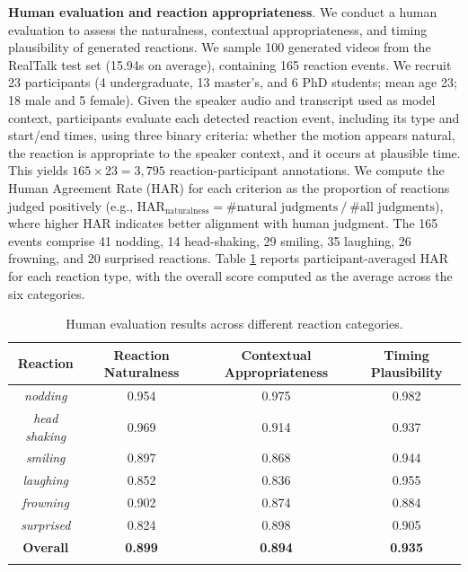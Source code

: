 


\textbf{Human evaluation and reaction appropriateness}. We conduct a human evaluation to assess the naturalness, contextual appropriateness, and timing plausibility of generated reactions. We sample 100 generated videos from the RealTalk test set (15.94s on average), containing 165 reaction events. We recruit 23 participants (4 undergraduate, 13 master's, and 6 PhD students; mean age 23; 18 male and 5 female). Given the speaker audio and transcript used as model context, participants evaluate each detected reaction event, including its type and start/end times, using three binary criteria: whether the motion appears natural, the reaction is appropriate to the speaker context, and it occurs at plausible time. This yields $165\times23=3{,}795$ reaction-participant annotations. We compute the Human Agreement Rate (HAR) for each criterion as the proportion of reactions judged positively (e.g., $\mathrm{HAR}_{\text{naturalness}}=\#\text{natural judgments}\ /\ \#\text{all judgments}$), where higher HAR indicates better alignment with human judgment. The 165 events comprise 41 nodding, 14 head-shaking, 29 smiling, 35 laughing, 26 frowning, and 20 surprised reactions. Table \ref{tab:human_evaluation} reports participant-averaged HAR for each reaction type, with the overall score computed as the average across the six categories.

\begin{table}[t]
    \centering
    \fontsize{9pt}{7.5pt}\selectfont
    \setcellgapes{2pt}
    \makegapedcells
    \setlength{\tabcolsep}{2pt}
    \caption{Human evaluation results across different reaction categories.}
    \label{tab:human_evaluation}
    \begin{tabular}{c|c|c|c}
        \Xhline{1.2pt}
        Reaction & Reaction Naturalness & Contextual Appropriateness & Timing Plausibility \\
        \hline
        \textit{nodding} & 0.954 & 0.975 & 0.982 \\
        \textit{head shaking} & 0.969 & 0.914 & 0.937 \\
        \textit{smiling} & 0.897 & 0.868 & 0.944 \\
        \textit{laughing} & 0.852 & 0.836 & 0.955 \\
        \textit{frowning} & 0.902 & 0.874 & 0.884 \\
        \textit{surprised} & 0.824 & 0.898 & 0.905 \\
        \Xhline{0.5pt}
        \textbf{Overall} & \textbf{0.899} & \textbf{0.894} & \textbf{0.935} \\
        \Xhline{1.2pt}
    \end{tabular}
    \vspace{-2em}
\end{table}

